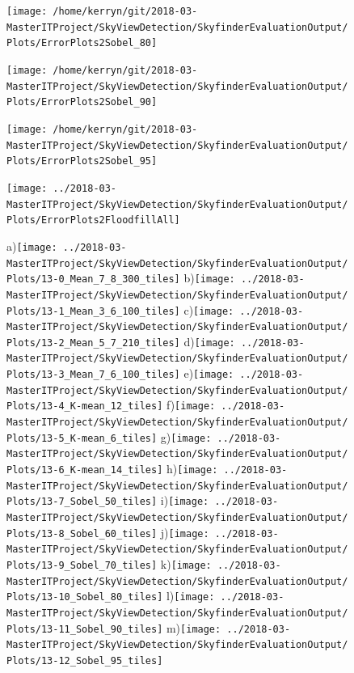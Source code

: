 \documentclass[final,3p,times,authoryear]{elsarticle}
\begin{document}
\begin{figure}
\centering
\texttt{[image: /home/kerryn/git/2018-03-MasterITProject/SkyViewDetection/SkyfinderEvaluationOutput/Plots/ErrorPlots2Sobel\_80]}
\caption{}
\label{fig:errorplots2sobel80}
\end{figure}
\begin{figure}
\centering
\texttt{[image: /home/kerryn/git/2018-03-MasterITProject/SkyViewDetection/SkyfinderEvaluationOutput/Plots/ErrorPlots2Sobel\_90]}
\caption{}
\label{fig:errorplots2sobel90}
\end{figure}
\begin{figure}
\centering
\texttt{[image: /home/kerryn/git/2018-03-MasterITProject/SkyViewDetection/SkyfinderEvaluationOutput/Plots/ErrorPlots2Sobel\_95]}
\caption{}
\label{fig:errorplots2sobel95}
\end{figure}

\begin{figure}
\centering
\texttt{[image: ../2018-03-MasterITProject/SkyViewDetection/SkyfinderEvaluationOutput/Plots/ErrorPlots2FloodfillAll]}
\caption{}
\label{fig:errorplots2floodfillall}
\end{figure}




\begin{figure}
\centering
a)\texttt{[image: ../2018-03-MasterITProject/SkyViewDetection/SkyfinderEvaluationOutput/Plots/13-0\_Mean\_7\_8\_300\_tiles]}
b)\texttt{[image: ../2018-03-MasterITProject/SkyViewDetection/SkyfinderEvaluationOutput/Plots/13-1\_Mean\_3\_6\_100\_tiles]}
c)\texttt{[image: ../2018-03-MasterITProject/SkyViewDetection/SkyfinderEvaluationOutput/Plots/13-2\_Mean\_5\_7\_210\_tiles]}
d)\texttt{[image: ../2018-03-MasterITProject/SkyViewDetection/SkyfinderEvaluationOutput/Plots/13-3\_Mean\_7\_6\_100\_tiles]}
e)\texttt{[image: ../2018-03-MasterITProject/SkyViewDetection/SkyfinderEvaluationOutput/Plots/13-4\_K-mean\_12\_tiles]}
f)\texttt{[image: ../2018-03-MasterITProject/SkyViewDetection/SkyfinderEvaluationOutput/Plots/13-5\_K-mean\_6\_tiles]}
g)\texttt{[image: ../2018-03-MasterITProject/SkyViewDetection/SkyfinderEvaluationOutput/Plots/13-6\_K-mean\_14\_tiles]}
h)\texttt{[image: ../2018-03-MasterITProject/SkyViewDetection/SkyfinderEvaluationOutput/Plots/13-7\_Sobel\_50\_tiles]}
i)\texttt{[image: ../2018-03-MasterITProject/SkyViewDetection/SkyfinderEvaluationOutput/Plots/13-8\_Sobel\_60\_tiles]}
j)\texttt{[image: ../2018-03-MasterITProject/SkyViewDetection/SkyfinderEvaluationOutput/Plots/13-9\_Sobel\_70\_tiles]}
k)\texttt{[image: ../2018-03-MasterITProject/SkyViewDetection/SkyfinderEvaluationOutput/Plots/13-10\_Sobel\_80\_tiles]}
l)\texttt{[image: ../2018-03-MasterITProject/SkyViewDetection/SkyfinderEvaluationOutput/Plots/13-11\_Sobel\_90\_tiles]}
m)\texttt{[image: ../2018-03-MasterITProject/SkyViewDetection/SkyfinderEvaluationOutput/Plots/13-12\_Sobel\_95\_tiles]}

\caption{}
\label{fig:13-9_Sobel_70_tiles}
\end{figure}
\end{document}
